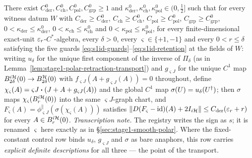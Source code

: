 \begin{lemma}\label{lem:stage1-inversion-derivative-transport}
There exist $C^{0}_{\mathrm{der}},C^{0}_{\mathrm{ch}},C^{0}_{\mathrm{pol}},C^{0}_{\mathrm{grp}}\ge1$
and $\kappa^{0}_{\mathrm{der}},\kappa^{0}_{\mathrm{ch}},\kappa^{0}_{\mathrm{pol}}\in(0,\tfrac12]$
such that for every witness datum $W$ with $C_{\mathrm{der}}\ge C^{0}_{\mathrm{der}}$,
$C_{\mathrm{ch}}\ge C^{0}_{\mathrm{ch}}$, $C_{\mathrm{pol}}\ge C^{0}_{\mathrm{pol}}$,
$C_{\mathrm{grp}}\ge C^{0}_{\mathrm{grp}}$, $0<\kappa_{\mathrm{der}}\le\kappa^{0}_{\mathrm{der}}$,
$0<\kappa_{\mathrm{ch}}\le\kappa^{0}_{\mathrm{ch}}$ and
$0<\kappa_{\mathrm{pol}}\le\kappa^{0}_{\mathrm{pol}}$, for every finite-dimensional
exact-unit $\varepsilon_r$-$C^*$-algebra, every $\delta>0$, every $\varsigma\in\{+1,-1\}$ and
every $0<r\le\delta$ satisfying the five guards
\eqref{eq:s1id-guards}--\eqref{eq:s1id-retention} at the fields of $W$: writing $u_\delta$
for the unique first component of the inverse of $\Pi_\delta$ (as in
Lemma~\ref{lem:stage1-polar-retraction-transport}) and $g_{\varsigma J}$ for the unique
$C^{1}$ map $B^{i\mathcal H}_{2\delta}(0)\to B^{\mathcal H}_{2\delta}(0)$ with
$f_{\varsigma J}(A+g_{\varsigma J}(A))=0$ throughout, define
$\chi_{\varsigma}(A)=\varsigma J\mathbin{\bm{\cdot}}(J+A+g_{\varsigma J}(A))$ and the global $C^{1}$ map
$\sigma(U)=u_\delta(U^{\dagger})$; then $\sigma$ maps $\chi_{\varsigma}(B^{i\mathcal H}_{r}(0))$ into
the same $\varsigma J$-graph chart, and
$F_{\varsigma}(A)=\phi^{\parallel}_{\varsigma J}(\sigma(\chi_{\varsigma}(A)))$ satisfies
$\lVert D(F_{\varsigma}-\mathrm{id})(A)+2I_{i\mathcal H}\rVert\le C_{\mathrm{der}}(\varepsilon_r+r)$ for every
$A\in B^{i\mathcal H}_{r}(0)$.
\emph{Transcription note.} The registry writes the sign as $s$; it is renamed $\varsigma$
here exactly as in \S\ref{sec:stage1-smooth-polar}. Where the fixed-constant control row
binds $u_\delta$, $g_{\varsigma J}$ and $\sigma$ as bare anaphors, this row carries
\emph{explicit definite descriptions} for all three --- the point of the transport.
\end{lemma}

